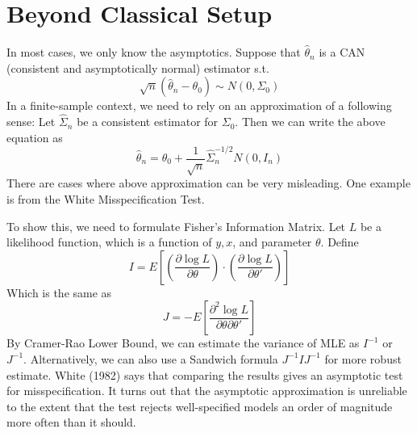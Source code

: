 \section{Beyond Classical Setup}
In most cases, we only know the asymptotics. Suppose that $\hat{\theta}_n$ is a CAN (consistent and asymptotically normal) estimator s.t.
\[
\sqrt{n}(\hat{\theta}_n-\theta_0) \sim N(0,\Sigma_0)
\]
In a finite-sample context, we need to rely on an approximation of a following sense: Let $\widehat{\Sigma}_n$ be a consistent estimator for $\Sigma_0$. Then we can write the above equation as
\[
\hat{\theta}_n = \theta_0+\frac{1}{\sqrt{n}}\widehat{\Sigma}_n^{-1/2}N(0, I_n)
\]
There are cases where above approximation can be very misleading. One example is from the White Misspecification Test. \par
To show this, we need to formulate Fisher's Information Matrix. Let $L$ be a likelihood function, which is a function of $y,x$, and parameter $\theta$. Define 
\[
I=E\left[\left(\frac{\partial \log{L}}{\partial \theta}\right)\cdot\left(\frac{\partial \log{L}}{\partial \theta'}\right)\right]
\]
Which is the same as
\[
J=-E\left[\frac{\partial^2 \log{L}}{\partial \theta \partial \theta'}\right]
\]
By Cramer-Rao Lower Bound, we can estimate the variance of MLE as $I^{-1}$ or $J^{-1}$. Alternatively, we can also use a Sandwich formula $J^{-1}IJ^{-1}$ for more robust estimate. White (1982) says that comparing the results gives an asymptotic test for misspecification. It turns out that the asymptotic approximation is unreliable to the extent that the test rejects well-specified models an order of magnitude more often than it should. \par
